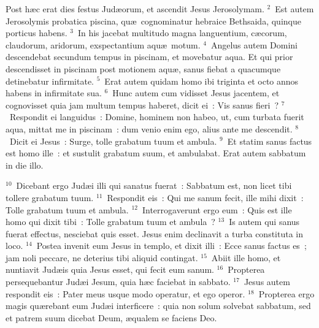 \lettrine[lines=10,image=true,loversize=0.05,lraise=-0.03]{P}{}ost h\ae c erat dies festus Jud\ae orum, et ascendit Jesus Jerosolymam.
${}^{2}$~Est autem Jerosolymis probatica piscina, qu\ae\ cognominatur hebraice Bethsaida, quinque porticus habens.
${}^{3}$~In his jacebat multitudo magna languentium, c\ae corum, claudorum, aridorum, exspectantium aqu\ae\ motum.
${}^{4}$~Angelus autem Domini descendebat secundum tempus in piscinam, et movebatur aqua. Et qui prior descendisset in piscinam post motionem aqu\ae , sanus fiebat a quacumque detinebatur infirmitate.
${}^{5}$~Erat autem quidam homo ibi triginta et octo annos habens in infirmitate sua.
${}^{6}$~Hunc autem cum vidisset Jesus jacentem, et cognovisset quia jam multum tempus haberet, dicit ei~: Vis sanus fieri~?
${}^{7}$~Respondit ei languidus~: Domine, hominem non habeo, ut, cum turbata fuerit aqua, mittat me in piscinam~: dum venio enim ego, alius ante me descendit.
${}^{8}$~Dicit ei Jesus~: Surge, tolle grabatum tuum et ambula.
${}^{9}$~Et statim sanus factus est homo ille~: et sustulit grabatum suum, et ambulabat. Erat autem sabbatum in die illo.


${}^{10}$~Dicebant ergo Jud\ae i illi qui sanatus fuerat~: Sabbatum est, non licet tibi tollere grabatum tuum.
${}^{11}$~Respondit eis~: Qui me sanum fecit, ille mihi dixit~: Tolle grabatum tuum et ambula.
${}^{12}$~Interrogaverunt ergo eum~: Quis est ille homo qui dixit tibi~: Tolle grabatum tuum et ambula~?
${}^{13}$~Is autem qui sanus fuerat effectus, nesciebat quis esset. Jesus enim declinavit a turba constituta in loco.
${}^{14}$~Postea invenit eum Jesus in templo, et dixit illi~: Ecce sanus factus es~; jam noli peccare, ne deterius tibi aliquid contingat.
${}^{15}$~Abiit ille homo, et nuntiavit Jud\ae is quia Jesus esset, qui fecit eum sanum.
${}^{16}$~Propterea persequebantur Jud\ae i Jesum, quia h\ae c faciebat in sabbato.
${}^{17}$~Jesus autem respondit eis~: Pater meus usque modo operatur, et ego operor.
${}^{18}$~Propterea ergo magis qu\ae rebant eum Jud\ae i interficere~: quia non solum solvebat sabbatum, sed et patrem suum dicebat Deum, \ae qualem se faciens Deo.

